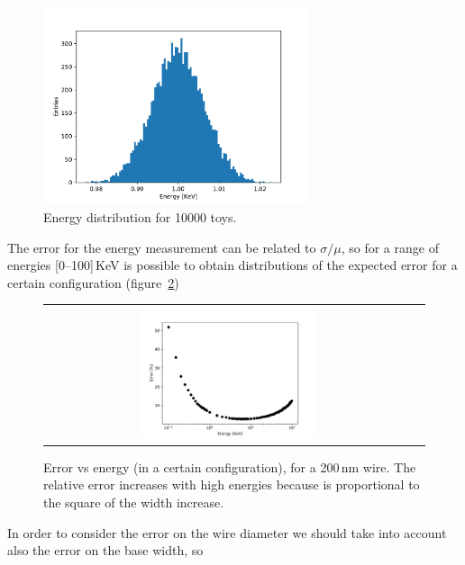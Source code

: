 \documentclass[a4paper,12pt]{article}
\begin{document}
\begin{figure}[!ht]
  \begin{center}
    \includegraphics[width=0.69\textwidth]{energy_distribution}
    \caption{Energy distribution for 10000 toys.}
    \label{fig:energy_distribution}
  \end{center}
\end{figure}

The error for the energy measurement can be related to $\sigma/\mu$, so for a range of energies [0--100]\,KeV is possible to obtain distributions of the expected error for a certain configuration (figure~\ref{fig:error})

\begin{figure}[!ht]
  \begin{center}
    \begin{tabular}{cc}
    \includegraphics[width=0.49\textwidth]{error_200nm}
    \end{tabular}
    \caption{Error vs energy (in a certain configuration), for a 200\,nm wire. The relative error increases with high energies because is proportional to the square of the width increase.}
    \label{fig:error}
  \end{center}
\end{figure}

In order to consider the error on the wire diameter we should take into account also the error on the base width, so
\end{document}
